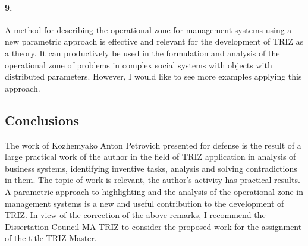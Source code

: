 \documentclass[11pt,a4paper]{article}
\begin{document}
\paragraph{9.}
A method for describing the operational zone for management systems using a
new parametric approach is effective and relevant for the development of TRIZ
as a theory. It can productively be used in the formulation and analysis of
the operational zone of problems in complex social systems with objects with
distributed parameters. However, I would like to see more examples applying
this approach.

\subsection*{Conclusions}
The work of Kozhemyako Anton Petrovich presented for defense is the result of
a large practical work of the author in the field of TRIZ application in
analysis of business systems, identifying inventive tasks, analysis and
solving contradictions in them. The topic of work is relevant, the author’s
activity has practical results. A parametric approach to highlighting and the
analysis of the operational zone in management systems is a new and useful
contribution to the development of TRIZ.  In view of the correction of the
above remarks, I recommend the Dissertation Council MA TRIZ to consider the
proposed work for the assignment of the title TRIZ Master.
\end{document}
